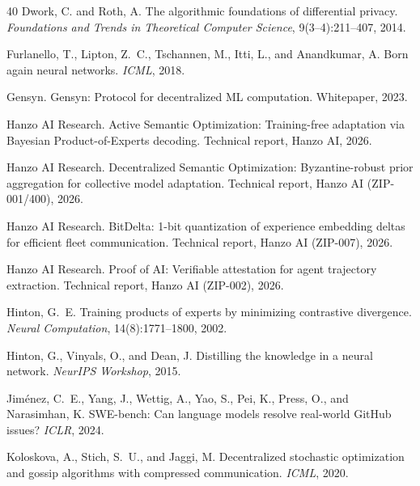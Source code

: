 \documentclass[11pt]{article}
\begin{document}
\begin{thebibliography}{40}
Dwork, C. and Roth, A.
\newblock The algorithmic foundations of differential privacy.
\newblock \emph{Foundations and Trends in Theoretical Computer Science},
  9(3--4):211--407, 2014.

Furlanello, T., Lipton, Z.~C., Tschannen, M., Itti, L., and Anandkumar, A.
\newblock Born again neural networks.
\newblock \emph{ICML}, 2018.

Gensyn.
\newblock Gensyn: Protocol for decentralized ML computation.
\newblock Whitepaper, 2023.

Hanzo AI Research.
\newblock Active Semantic Optimization: Training-free adaptation via Bayesian
  Product-of-Experts decoding.
\newblock Technical report, Hanzo AI, 2026.

Hanzo AI Research.
\newblock Decentralized Semantic Optimization: Byzantine-robust prior
  aggregation for collective model adaptation.
\newblock Technical report, Hanzo AI (ZIP-001/400), 2026.

Hanzo AI Research.
\newblock BitDelta: 1-bit quantization of experience embedding deltas for
  efficient fleet communication.
\newblock Technical report, Hanzo AI (ZIP-007), 2026.

Hanzo AI Research.
\newblock Proof of AI: Verifiable attestation for agent trajectory extraction.
\newblock Technical report, Hanzo AI (ZIP-002), 2026.

Hinton, G.~E.
\newblock Training products of experts by minimizing contrastive divergence.
\newblock \emph{Neural Computation}, 14(8):1771--1800, 2002.

Hinton, G., Vinyals, O., and Dean, J.
\newblock Distilling the knowledge in a neural network.
\newblock \emph{NeurIPS Workshop}, 2015.

Jim{\'e}nez, C.~E., Yang, J., Wettig, A., Yao, S., Pei, K., Press, O.,
  and Narasimhan, K.
\newblock SWE-bench: Can language models resolve real-world {GitHub} issues?
\newblock \emph{ICLR}, 2024.

Koloskova, A., Stich, S.~U., and Jaggi, M.
\newblock Decentralized stochastic optimization and gossip algorithms with
  compressed communication.
\newblock \emph{ICML}, 2020.


\end{thebibliography}
\end{document}
